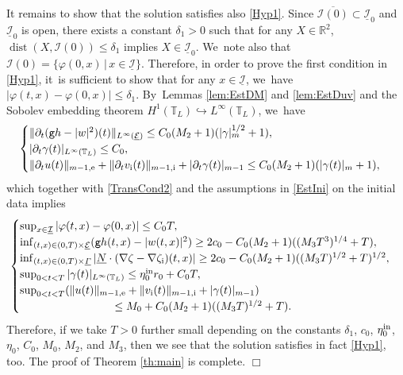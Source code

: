 \documentclass[JEP,XML,SOM,Unicode,NoFloatCountersInSection,published]{cedram}
\newcommand{\gr}{{\mathtt g}}
\newcommand{\R}{{\mathbb R}}
\newcommand{\dt}{\partial_t}
\newcommand{\cI}{{\mathcal I}}
\newcommand{\cE}{{\mathcal E}}
\newcommand{\ul}[1]{\underline{#1}}
\newcommand{\itGamma}{\mathit{\Gamma}}
\theoremstyle{definition}
\begin{document}
It remains to show that the solution satisfies also \eqref{Hyp1}.
Since $\overline{\cI(0)} \subset \ul{\cI}_0$ and $\ul{\cI}_0$ is open, there exists a constant $\delta_1>0$ such that for any $X\in\R^2$,
$\operatorname{dist}(X,\cI(0))\leq\delta_1$ implies $X\in\ul{\cI}_0$. We~note also that $\cI(0)=\{ \varphi(0,x) \,|\, x\in\ul{\cI} \}$.
Therefore, in order to prove the first condition in \eqref{Hyp1}, it~is sufficient to show that for any $x\in\ul{\cI}$, we~have $|\varphi(t,x)-\varphi(0,x)|\leq\delta_1$. By~Lemmas \ref{lem:EstDM} and \ref{lem:EstDuv} and the Sobolev embedding theorem $H^1(\mathbb{T}_L) \hookrightarrow L^\infty(\mathbb{T}_L)$, we~have
\[
\begin{cases}
\|\dt(\gr h-|w|^2)(t)\|_{L^\infty(\ul{\cE})} \leq C_0(M_2+1)(|\gamma|_m^{1/2}+1), \\
|\dt\gamma(t)|_{L^\infty(\mathbb{T}_L)} \leq C_0, \\
\|\dt u(t)\|_{m-1,{\rm e}}+\|\dt v_\mathrm{i}(t)\|_{m-1,{\rm i}}+|\dt\gamma(t)|_{m-1} \leq C_0(M_2+1)(|\gamma(t)|_m+1),
\end{cases}
\]
which together with \eqref{TransCond2} and the assumptions in \eqref{EstIni} on the initial data implies
\[
\begin{cases}
\sup_{x\in\ul{\cI}}|\varphi(t,x)-\varphi(0,x)| \leq C_0T, \\
\inf_{(t,x)\in(0,T)\times\ul{\cE}}(\gr h(t,x)-|w(t,x)|^2) \geq 2c_0 - C_0(M_2+1)((M_3T^3)^{1/4}+T), \\
\inf_{(t,x)\in(0,T)\times\ul{\itGamma}}| \ul{N}\cdot(\nabla\zeta-\nabla\zeta_\mathrm{i})(t,x)| \geq 2c_0 - C_0(M_2+1)((M_3T)^{1/2}+T)^{1/2}, \\
\sup_{0<t<T}|\gamma(t)|_{L^\infty(\mathbb{T}_L)} \leq \eta_0^{\rm in}r_0 + C_0T, \\
\sup_{0<t<T}(\|u(t)\|_{m-1,{\rm e}} + \|v_\mathrm{i}(t)\|_{m-1,{\rm i}} + |\gamma(t)|_{m-1}) \\
\hspace{3cm}\leq M_0 + C_0(M_2+1)((M_3T)^{1/2}+T).
\end{cases}
\]
Therefore, if we take $T>0$ further small depending on the constants $\delta_1$, $c_0$, $\eta_0^{\rm in}$, $\eta_0$, $C_0$, $M_0$, $M_2$, and $M_3$,
then we see that the solution satisfies in fact \eqref{Hyp1}, too.
The proof of Theorem \ref{th:main} is complete.
\hfill$\Box$




\end{document}
